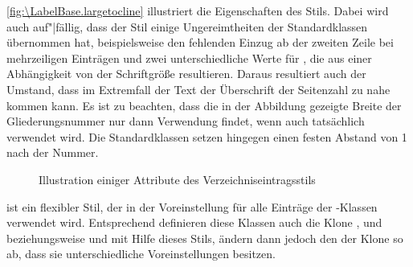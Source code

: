 \begin{description}
  \autoref{fig:\LabelBase.largetocline} illustriert die
  Eigenschaften
  des Stils. Dabei wird auch auf"|fällig, dass der Stil einige Ungereimtheiten
  der Standardklassen übernommen hat, beispielsweise den fehlenden Einzug ab
  der zweiten Zeile bei mehrzeiligen Einträgen und zwei unterschiedliche Werte
  für , die aus einer Abhängigkeit von der Schriftgröße
  resultieren. Daraus resultiert auch der Umstand, dass im Extremfall der Text
  der Überschrift der Seitenzahl zu nahe kommen kann.  Es ist zu beachten, dass
  die in der Abbildung gezeigte Breite der Gliederungsnummer nur dann
  Verwendung findet, wenn auch tatsächlich 
  verwendet wird. Die Standardklassen setzen hingegen einen festen Abstand von
  1 nach der Nummer.
  \begin{figure}
    \centering
    \caption{Illustration einiger Attribute des Verzeichniseintragsstils
      }
  \end{figure}
\item[\PValue{tocline}] ist ein flexibler Stil, der in der Voreinstellung für
  alle Einträge der \KOMAScript-Klassen verwendet wird. Entsprechend
  definieren diese Klassen auch die Klone ,  und
   beziehungsweise  und 
  mit Hilfe dieses Stils, ändern dann jedoch den 
  der Klone so ab, dass sie unterschiedliche Voreinstellungen besitzen.


\end{description}
